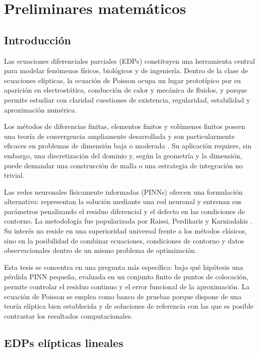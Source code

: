 \chapter{Preliminares matem\'aticos}

\section{Introducci\'on}

Las ecuaciones diferenciales parciales (EDPs) constituyen una herramienta central para modelar fenómenos físicos, biológicos y de ingeniería. Dentro de la clase de ecuaciones elípticas, la ecuación de Poisson ocupa un lugar prototípico por su aparición en electrostática, conducción de calor y mecánica de fluidos, y porque permite estudiar con claridad cuestiones de existencia, regularidad, estabilidad y aproximación numérica.

Los métodos de diferencias finitas, elementos finitos y volúmenes finitos poseen una teoría de convergencia ampliamente desarrollada y son particularmente eficaces en problemas de dimensión baja o moderada \cite{strang1973, leveque2007, babuska1994}. Su aplicación requiere, sin embargo, una discretización del dominio y, según la geometría y la dimensión, puede demandar una construcción de malla o una estrategia de integración no trivial.

Las redes neuronales físicamente informadas (PINNs) ofrecen una formulación alternativa: representan la solución mediante una red neuronal y entrenan sus parámetros penalizando el residuo diferencial y el defecto en las condiciones de contorno. La metodología fue popularizada por Raissi, Perdikaris y Karniadakis \cite{raissi2019}. Su interés no reside en una superioridad universal frente a los métodos clásicos, sino en la posibilidad de combinar ecuaciones, condiciones de contorno y datos observacionales dentro de un mismo problema de optimización.

Esta tesis se concentra en una pregunta más específica: bajo qué hipótesis una pérdida PINN pequeña, evaluada en un conjunto finito de puntos de colocación, permite controlar el residuo continuo y el error funcional de la aproximación. La ecuación de Poisson se emplea como banco de pruebas porque dispone de una teoría elíptica bien establecida y de soluciones de referencia con las que es posible contrastar los resultados computacionales.

\section{EDPs elípticas lineales}

